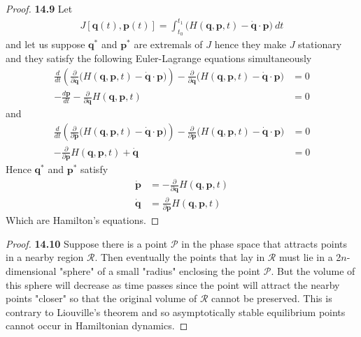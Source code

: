 \documentclass[11pt]{article}
\theoremstyle{definition}
\begin{document}
\cleardoublepage
\begin{proof}{\textbf{14.9}}
    Let 
    \begin{align*}
        J[\bm{q}(t), \bm{p}(t)]
        = \int_{t_0}^{t_1} \big(H(\bm{q}, \bm{p}, t)
        - \dot{\bm{q}} \cdot \bm{p}\big)~dt
    \end{align*}
    and let us suppose $\bm{q}^*$ and $\bm{p}^*$ are extremals of $J$ hence
    they make $J$ stationary and they satisfy the following
    Euler-Lagrange equations simultaneously
    \begin{align*}
        \frac{d}{dt}\left(\frac{\partial}{\partial \dot{\bm{q}}}
        \big(
            H(\bm{q}, \bm{p}, t) - \dot{\bm{q}} \cdot \bm{p}
        \big)
        \right)
        - \frac{\partial}{\partial \bm{q}}
        \big(
            H(\bm{q}, \bm{p}, t) - \dot{\bm{q}} \cdot \bm{p}
        \big) &= 0\\
        -\frac{d \bm{p}}{dt}
        -\frac{\partial}{\partial \bm{q}}H(\bm{q}, \bm{p}, t) &= 0
    \end{align*}
    and
    \begin{align*}
        \frac{d}{dt}\left(\frac{\partial}{\partial \dot{\bm{p}}}
        \big(
            H(\bm{q}, \bm{p}, t) - \dot{\bm{q}} \cdot \bm{p}
        \big)
        \right)
        - \frac{\partial}{\partial \bm{p}}
        \big(
            H(\bm{q}, \bm{p}, t) - \dot{\bm{q}} \cdot \bm{p}
        \big) &= 0\\
        -\frac{\partial}{\partial \bm{p}}H(\bm{q}, \bm{p}, t)
        + \dot{\bm{q}} &= 0
    \end{align*}
    Hence $\bm{q}^*$ and $\bm{p}^*$ satisfy
    \begin{align*}
        \dot{\bm{p}} &= 
        -\frac{\partial}{\partial \bm{q}}H(\bm{q}, \bm{p}, t)\\
        \dot{\bm{q}} &=
        \frac{\partial}{\partial \bm{p}}H(\bm{q}, \bm{p}, t)
    \end{align*}
    Which are Hamilton's equations.
\end{proof}
\begin{proof}{\textbf{14.10}}
    Suppose there is a point $\mathcal{P}$ in the phase space that
    attracts points in a nearby region $\mathcal{R}$. Then eventually the
    points that lay in $\mathcal{R}$ must lie in a 2$n$-dimensional
    "sphere" of a small "radius" enclosing the point $\mathcal{P}$.
    But the volume of this sphere will decrease as time passes since the point
    will attract the nearby points "closer" so that
    the original volume of $\mathcal{R}$ cannot be preserved.
    This is contrary to Liouville's theorem and so asymptotically stable
    equilibrium points cannot occur in Hamiltonian dynamics.
\end{proof}
\end{document}
